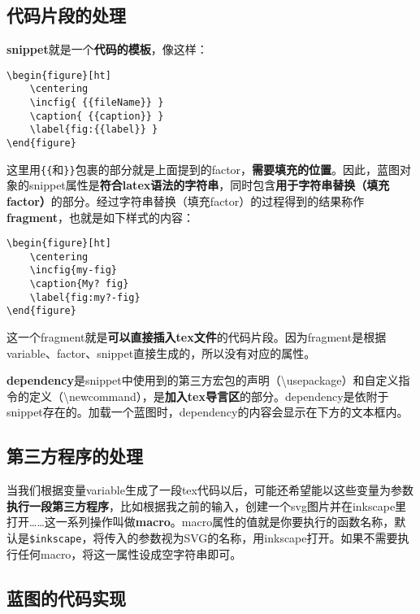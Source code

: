 \documentclass[AutoFakeBold,letterpaper,12pt,hidelinks]{article}
\newcommand{\incfig}[1]{%
    \def\svgwidth{\columnwidth}
    {#1.pdf_tex}
}
\begin{document}
\subsection{代码片段的处理}

\textbf{snippet}就是一个\textbf{代码的模板}，像这样：

\begin{verbatim}
\begin{figure}[ht]
    \centering
    \incfig{ {{fileName}} }
    \caption{ {{caption}} }
    \label{fig:{{label}} }
\end{figure}
\end{verbatim}

这里用\texttt{\{\{}和\texttt{\}\}}包裹的部分就是上面提到的factor，\textbf{需要填充的位置}。因此，蓝图对象的snippet属性是\textbf{符合latex语法的字符串}，同时包含\textbf{用于字符串替换（填充factor）}的部分。经过字符串替换（填充factor）的过程得到的结果称作\textbf{fragment}，也就是如下样式的内容：

\begin{verbatim}
\begin{figure}[ht]
    \centering
    \incfig{my-fig}
    \caption{My? fig}
    \label{fig:my?-fig}
\end{figure}    
\end{verbatim}

这一个fragment就是\textbf{可以直接插入tex文件}的代码片段。因为fragment是根据variable、factor、snippet直接生成的，所以没有对应的属性。

\textbf{dependency}是snippet中使用到的第三方宏包的声明（\textbackslash usepackage）和自定义指令的定义（\textbackslash newcommand），是\textbf{加入tex导言区}的部分。dependency是依附于snippet存在的。加载一个蓝图时，dependency的内容会显示在下方的文本框内。

\subsection{第三方程序的处理}

当我们根据变量variable生成了一段tex代码以后，可能还希望能以这些变量为参数\textbf{执行一段第三方程序}，比如根据我之前的输入，创建一个svg图片并在inkscape里打开\ldots\ldots 这一系列操作叫做\textbf{macro}。macro属性的值就是你要执行的函数名称，默认是\texttt{\$inkscape}，将传入的参数视为SVG的名称，用inkscape打开。如果不需要执行任何macro，将这一属性设成空字符串即可。

\subsection{蓝图的代码实现}
\end{document}
